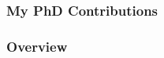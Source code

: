 \documentclass[8pt,xcolor=table,aspectratio=169]{beamer}
\begin{document}
\begin{frame}[label=current]
\frametitle{My PhD Contributions}

\begin{figure}
\centering

\ovEBM
\ovVWDPM

\ovDKT
\ovTadpole

\ovPainter

\end{figure}

\end{frame}


\begin{frame}
\frametitle{Overview}


\begin{figure}
\centering

{
\ovEBM
\ovVWDPM

\ovDKT}
\ovTadpole

\ovPainter

\end{figure}
\end{frame}





\end{document}
